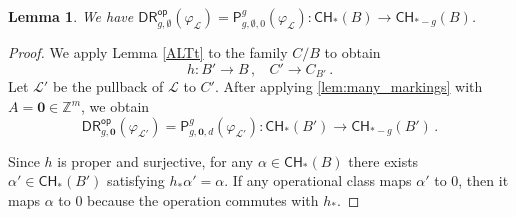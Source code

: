 \documentclass[a4paper,12pt]{article} %
\newcommand{\ca}[1]{{\mathcal{#1}}}
\newcommand{\bd}[1]{{\mathbf{#1}}}
\def\P{\mathsf{P}}
\theoremstyle{definition}
\theoremstyle{plain}%
\newtheorem{lemma}[definition]{Lemma}
\renewcommand{\phi}{\varphi}
\newcommand{\Picabs}{\mathfrak{Pic}}
\newcommand{\Chow}{\mathsf{CH}}
\newcommand{\invnrIV}{VI}
\newcommand{\jocomment}[1]{}
\newcommand{\DRop}{\mathsf{DR}^{\mathsf{op}}}
\begin{document}
\begin{lemma} \label{Lem:DR_alteration_invar}
We have %
$\DRop_{g,\emptyset}(\phi_{\ca L})=
\P_{g,\emptyset,0}^g(\phi_{\ca L}) :\Chow_*(B) \to \Chow_{*-g}(B)$. 
\end{lemma}
\begin{proof}
We apply Lemma \ref{ALTt} to the family $C/B$ to obtain
$$h\colon B' \to B\, , \ \ \ \ C' \to C_{B'}\, .$$ 
Let $\ca L'$ be the pullback of $\ca L$ to $C'$.
After applying \cref{lem:many_markings} with $A = \bd 0 \in \mathbb{Z}^m$, we obtain
\begin{equation}\label{eq:an_equality}
\DRop_{g,\bd 0}(\phi_{\ca L'})=\P_{g,\bd 0,d}^g(\phi_{\ca L'}):
\Chow_*(B') \to \Chow_{*-g}(B')\, .
\end{equation}


Since $h$ is proper and surjective, for any $\alpha \in \Chow_*(B)$ there exists $\alpha'\in \Chow_*(B')$ satisfying $h_*\alpha'=\alpha$. If any operational class maps $\alpha'$ to $0$, then it maps $\alpha$ to $0$ because the operation 
commutes with $h_*$. 







\end{proof}
\end{document}
